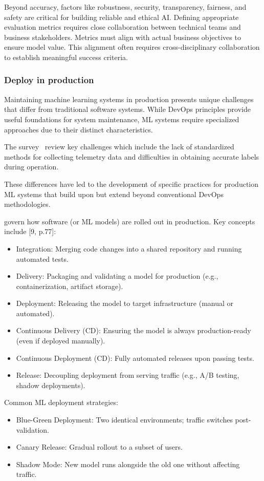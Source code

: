 Beyond accuracy, factors like robustness, security, transparency, fairness, and safety are critical for building reliable and ethical AI\cite{10.1145/3555803}.
Defining appropriate evaluation metrics requires close collaboration between technical teams and business stakeholders\cite{10.1145/3533378}.
Metrics must align with actual business objectives to ensure model value.
This alignment often requires cross-disciplinary collaboration to establish meaningful success criteria.

\subsubsection{Deploy in production}
Maintaining machine learning systems in production presents unique challenges that differ from traditional software systems.
While DevOps principles provide useful foundations for system maintenance, ML systems require specialized approaches due to their distinct characteristics\cite{10.1145/3533378}.

The survey~\cite{10.1145/3533378} review key challenges which include the lack of standardized methods for collecting telemetry data and difficulties in obtaining accurate labels during operation.

These differences have led to the development of specific practices for production ML systems that build upon but extend beyond conventional DevOps methodologies\cite{gift2021practical,10.1145/3533378}.


\label{subsec:deployment-strategies}
govern how software (or ML models) are rolled out in production.
Key concepts include [9, p.77]:

\begin{itemize}
    \item Integration: Merging code changes into a shared repository and running automated tests.
    \item Delivery: Packaging and validating a model for production (e.g., containerization, artifact storage).
    \item Deployment: Releasing the model to target infrastructure (manual or automated).
    \item Continuous Delivery (CD): Ensuring the model is always production-ready (even if deployed manually).
    \item Continuous Deployment (CD): Fully automated releases upon passing tests.
    \item Release: Decoupling deployment from serving traffic (e.g., A/B testing, shadow deployments).
\end{itemize}
Common ML deployment strategies\cite{gift2021practical}:
\begin{itemize}
    \item Blue-Green Deployment: Two identical environments; traffic switches post-validation.
    \item Canary Release: Gradual rollout to a subset of users.
    \item Shadow Mode: New model runs alongside the old one without affecting traffic.
\end{itemize}


